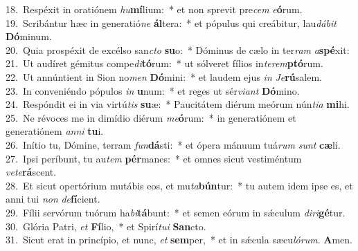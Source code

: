 {18.~}Respéxit in oratiónem \textit{hu}\textbf{mí}lium:~* et non sprevit pre\textit{cem} \textit{e}\textbf{ó}rum.\\
{19.~}Scribántur hæc in generatió\textit{ne} \textbf{ál}tera:~* et pópulus qui creábitur, lau\textit{dá}\textit{bit} \textbf{Dó}minum.\\
{20.~}Quia prospéxit de excélso san\textit{cto} \textbf{su}o:~* Dóminus de cælo in ter\textit{ram} \textit{a}\textbf{spé}xit:\\
{21.~}Ut audíret gémitus compe\textit{di}\textbf{tó}rum:~* ut sólveret fílios in\textit{te}\textit{rem}\textbf{ptó}rum.\\
{22.~}Ut annúntient in Sion no\textit{men} \textbf{Dó}mini:~* et laudem ejus \textit{in} \textit{Je}\textbf{rú}salem.\\
{23.~}In conveniéndo pópulos \textit{in} \textbf{u}num:~* et reges ut sér\textit{vi}\textit{ant} \textbf{Dó}mino.\\
{24.~}Respóndit ei in via virtú\textit{tis} \textbf{su}æ:~* Paucitátem diérum meórum nún\textit{ti}\textit{a} \textbf{mi}hi.\\
{25.~}Ne révoces me in dimídio diérum \textit{me}\textbf{ó}rum:~* in generatiónem et generatiónem \textit{an}\textit{ni} \textbf{tu}i.\\
{26.~}Inítio tu, Dómine, terram \textit{fun}\textbf{dá}sti:~* et ópera mánuum tuá\textit{rum} \textit{sunt} \textbf{cæ}li.\\
{27.~}Ipsi períbunt, tu au\textit{tem} \textbf{pér}manes:~* et omnes sicut vestiméntum \textit{ve}\textit{te}\textbf{rá}scent.\\
{28.~}Et sicut opertórium mutábis eos, et mu\textit{ta}\textbf{bún}tur:~* tu autem idem ipse es, et anni tui \textit{non} \textit{de}\textbf{fí}cient.\\
{29.~}Fílii servórum tuórum ha\textit{bi}\textbf{tá}bunt:~* et semen eórum in sǽculum \textit{di}\textit{ri}\textbf{gé}tur.\\
{30.~}Glória Patri, \textit{et} \textbf{Fí}lio,~* et Spirí\textit{tu}\textit{i} \textbf{San}cto.\\
{31.~}Sicut erat in princípio, et nunc, \textit{et} \textbf{sem}per,~* et in sǽcula sæcu\textit{ló}\textit{rum}. \textbf{A}men.\\
